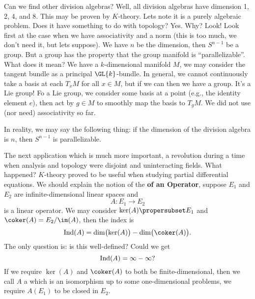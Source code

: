 Can we find other division algebras? Well, all division algebras
have dimension 1, 2, 4, and 8. This may be proven by
$K$-theory. Lets note it is a purely algebraic problem. Does it
have something to do with topology? Yes. Why? Look! Look first at
the case when we have associativity and a norm (this is too much,
we don't need it, but lets suppose). We have $n$ be the
dimension, then $S^{n-1}$ be a group. But a group has the
property that the group manifold is ``parallelizable''. What does
it mean? We have a $k$-dimensional manifold $M$, we may consider
the tangent bundle as a principal $\GL{k}$-bundle. In general, we
cannot continuously take a basis at each $T_{x}M$ for all $x\in
M$, but if we can then we have a group. It's a Lie group! Fo a
Lie group, we consider some basis at a point (e.g., the identity
element $e$), then act by $g\in M$ to smoothly map the basis to
$T_{g}M$. We did not use (nor need) associativity so far.

In reality, we may say the following thing: if the dimension of
the division algebra is $n$, then $S^{n-1}$ is parallelizable.

\bigbreak
The next application which is much more important, a revolution
during a time when analysis and topology were disjoint and
uninteracting fields. What happened? $K$-theory proved to be
useful when studying partial differential equations. We should
explain the notion of the  \textbf{of an Operator},
suppose $E_{1}$ and $E_{2}$ are infinite-dimensional linear
spaces and 
\begin{equation}
A\colon E_{1}\to E_{2}
\end{equation}
is a linear operator. 
We may consider $\ker(A)\propersubset E_{1}$ and
$\coker(A)=E_{2}/\im(A)$, then the index is
\begin{equation}
\ind(A)=\dim\bigl(\ker(A)\bigr)-\dim\bigl(\coker(A)\bigr).
\end{equation}
The only question is: is this well-defined? Could we get
\begin{equation}
\mathop{\mathrm{Ind}}\nolimits(A)=\infty-\infty?
\end{equation}
If we require $\ker(A)$ and $\coker(A)$ to both be
finite-dimensional, then we call $A$ a 
which is an isomorphism up to some one-dimensional problems, we
require $A(E_{1})$ to be closed in $E_{2}$.


